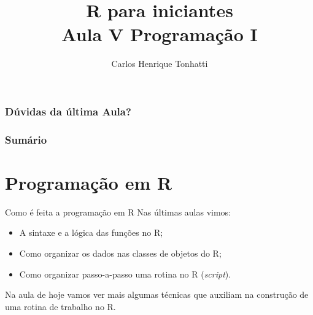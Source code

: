 \documentclass[handout]{beamer}
\title[Linguagem R]{R para iniciantes\\ Aula V Programação I}
\author {Carlos Henrique Tonhatti}
\institute[Unicamp]{Universidade Estadual de Campinas}
\date{}
\begin{document}
\frame{\titlepage} %

\begin{frame}
  \frametitle{Dúvidas da última Aula?}
\end{frame}

\begin{frame}
 \frametitle{Sumário}
 \tableofcontents[pausesections]
  \setcounter{tocdepth}{2}%
\end{frame}


\section{Programação em R}
\begin{frame}{Como é feita a programação em R}
  Nas últimas aulas vimos:
  \begin{itemize}[<+->]
  \item A sintaxe e a lógica das funções no R;
  \item Como organizar os dados nas classes de objetos do R;
  \item Como organizar passo-a-passo uma rotina no R (\textit{script}).
  \end{itemize}
  \pause Na aula de hoje vamos ver mais algumas técnicas que auxiliam na construção de uma rotina de trabalho no R.
\end{frame}
\end{document}
